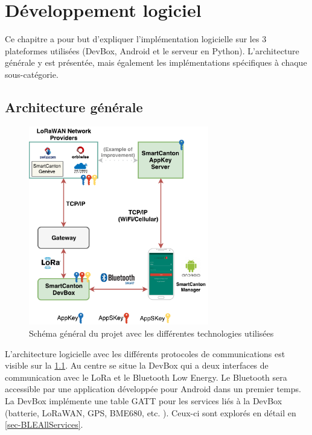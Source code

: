 \chapter{Développement logiciel}

Ce chapitre a pour but d'expliquer l'implémentation logicielle sur les 3 plateformes utilisées (DevBox, Android et le serveur en Python). L'architecture générale y est présentée, mais également les implémentations spécifiques à chaque sous-catégorie.


\section{Architecture générale}

\begin{figure}[ht!]
    \centering
    \includegraphics[width=0.7\textwidth]{Figures/Software/diagram_project_software.pdf}
    \caption{Schéma général du projet avec les différentes technologies utilisées}
    \label{fig-diagram_project_software}
\end{figure}

L'architecture logicielle avec les différents protocoles de communications est visible sur la \cref{fig-diagram_project_software}. Au centre se situe la DevBox qui a deux interfaces de communication avec le LoRa et le Bluetooth Low Energy. Le Bluetooth sera accessible par une application développée pour Android dans un premier temps. La DevBox implémente une table GATT pour les services liés à la DevBox (batterie, LoRaWAN, GPS, BME680, etc. ). Ceux-ci sont explorés en détail en \cref{sec-BLEAllServices}.



